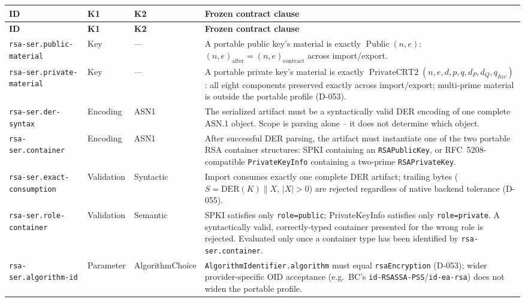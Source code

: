 \documentclass[11pt,a4paper]{article}
\begin{document}
\begin{longtable}{p{}p{}p{}p{}}
\toprule
\textbf{ID} & \textbf{K1} & \textbf{K2} & \textbf{Frozen contract clause}\\
\midrule
\endfirsthead
\toprule
\textbf{ID} & \textbf{K1} & \textbf{K2} & \textbf{Frozen contract clause}\\
\midrule
\endhead

\texttt{rsa-ser.public-material} &
Key &
--- &
A portable public key's material is exactly $\operatorname{Public}(n,e)$: $(n,e)_{\text{after}} = (n,e)_{\text{contract}}$ across import/export.\\

\texttt{rsa-ser.private-material} &
Key &
--- &
A portable private key's material is exactly $\operatorname{PrivateCRT2}(n,e,d,p,q,d_P,d_Q,q_{Inv})$: all eight components preserved exactly across import/export; multi-prime material is outside the portable profile (D-053).\\

\texttt{rsa-ser.der-syntax} &
Encoding &
ASN1 &
The serialized artifact must be a syntactically valid DER encoding of one complete ASN.1 object. Scope is parsing alone -- it does not determine which object.\\

\texttt{rsa-ser.container} &
Encoding &
ASN1 &
After successful DER parsing, the artifact must instantiate one of the two portable RSA container structures: SPKI containing an \texttt{RSAPublicKey}, or RFC~5208-compatible \texttt{PrivateKeyInfo} containing a two-prime \texttt{RSAPrivateKey}.\\

\texttt{rsa-ser.exact-consumption} &
Validation &
Syntactic &
Import consumes exactly one complete DER artifact; trailing bytes ($S=\text{DER}(K)\|X$, $|X|>0$) are rejected regardless of native backend tolerance (D-055).\\

\texttt{rsa-ser.role-container} &
Validation &
Semantic &
SPKI satisfies only \texttt{role=public}; PrivateKeyInfo satisfies only \texttt{role=private}. A syntactically valid, correctly-typed container presented for the wrong role is rejected. Evaluated only once a container type has been identified by \texttt{rsa-ser.container}.\\

\texttt{rsa-ser.algorithm-id} &
Parameter &
AlgorithmChoice &
\texttt{AlgorithmIdentifier.algorithm} must equal \texttt{rsaEncryption} (D-053); wider provider-specific OID acceptance (e.g.\ BC's \texttt{id-RSASSA-PSS}/\texttt{id-ea-rsa}) does not widen the portable profile.\\


\end{longtable}
\end{document}
